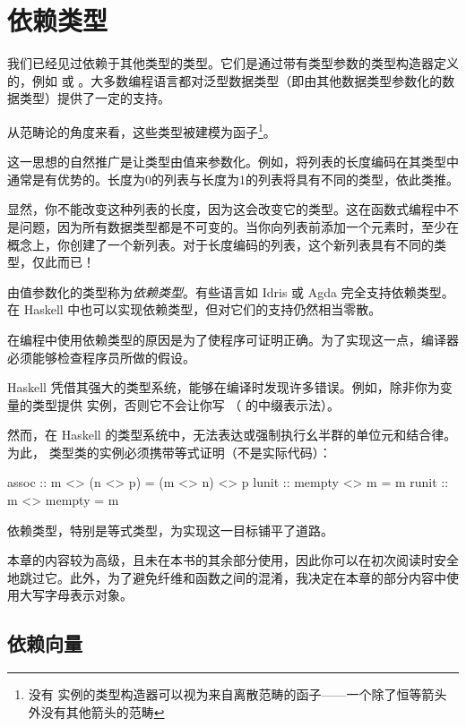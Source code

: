 \documentclass[DaoFP]{subfiles}
\begin{document}
\setcounter{chapter}{21}

\chapter{依赖类型}

我们已经见过依赖于其他类型的类型。它们是通过带有类型参数的类型构造器定义的，例如  或 \hask{[]}。大多数编程语言都对泛型数据类型（即由其他数据类型参数化的数据类型）提供了一定的支持。

从范畴论的角度来看，这些类型被建模为函子\footnote{没有  实例的类型构造器可以视为来自离散范畴的函子——一个除了恒等箭头外没有其他箭头的范畴}。

这一思想的自然推广是让类型由值来参数化。例如，将列表的长度编码在其类型中通常是有优势的。长度为0的列表与长度为1的列表将具有不同的类型，依此类推。

显然，你不能改变这种列表的长度，因为这会改变它的类型。这在函数式编程中不是问题，因为所有数据类型都是不可变的。当你向列表前添加一个元素时，至少在概念上，你创建了一个新列表。对于长度编码的列表，这个新列表具有不同的类型，仅此而已！

由值参数化的类型称为\emph{依赖类型}。有些语言如 Idris 或 Agda 完全支持依赖类型。在 Haskell 中也可以实现依赖类型，但对它们的支持仍然相当零散。

在编程中使用依赖类型的原因是为了使程序可证明正确。为了实现这一点，编译器必须能够检查程序员所做的假设。

Haskell 凭借其强大的类型系统，能够在编译时发现许多错误。例如，除非你为变量的类型提供  实例，否则它不会让你写 （ 的中缀表示法）。

然而，在 Haskell 的类型系统中，无法表达或强制执行幺半群的单位元和结合律。为此， 类型类的实例必须携带等式证明（不是实际代码）：
\begin{haskell}
assoc :: m <> (n <> p) = (m <> n) <> p
lunit :: mempty <> m = m
runit :: m <> mempty = m
\end{haskell}
依赖类型，特别是等式类型，为实现这一目标铺平了道路。

本章的内容较为高级，且未在本书的其余部分使用，因此你可以在初次阅读时安全地跳过它。此外，为了避免纤维和函数之间的混淆，我决定在本章的部分内容中使用大写字母表示对象。

\section{依赖向量}
\end{document}
